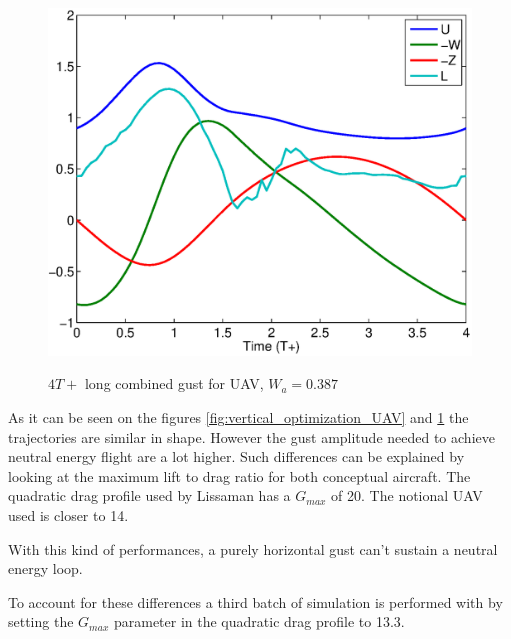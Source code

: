 \begin{figure}[h]
  \begin{center}
    \scalebox{0.8}
    {\includegraphics{./Figures/Windtype=3_Tg=4_Wg=0p387_UAV_alphamax=12.eps}}
  \end{center}
  \caption{$4T+$ long combined gust for UAV, $W_a=0.387$}
  \label{fig:combined_optimization_UAV}
\end{figure}

As it can be seen on the figures \ref{fig:vertical_optimization_UAV} and \ref{fig:combined_optimization_UAV} the trajectories are similar in shape. However the gust amplitude needed to achieve neutral energy flight are a lot higher.
Such differences can be explained by looking at the maximum lift to drag ratio for both conceptual aircraft.
The quadratic drag profile used by Lissaman has a $G_{max}$ of 20.
The notional UAV used is closer to 14.

\FloatBarrier

\par With this kind of performances, a purely horizontal gust can't sustain a neutral energy loop.


\par To account for these differences a third batch of simulation is performed with by setting the $G_{max}$ parameter in the quadratic drag profile to 13.3.


